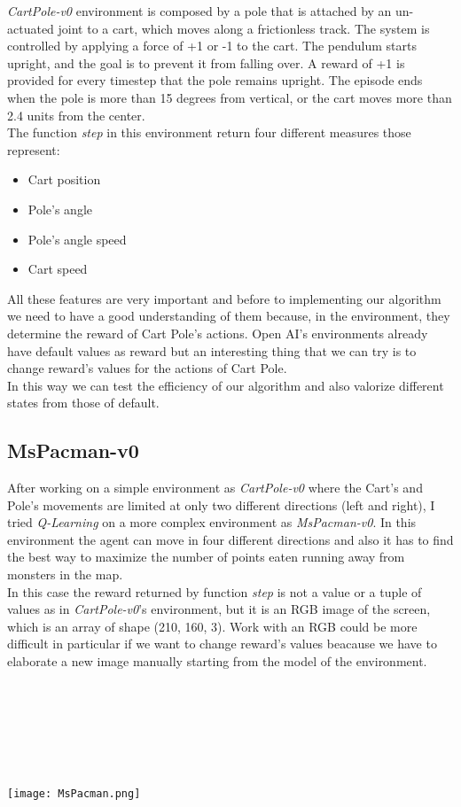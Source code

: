 \documentclass[]{report}
\begin{document}
\emph{CartPole-v0} environment is composed by a pole that is attached by an un-actuated joint to a cart, which moves along a frictionless track. The system is controlled by applying a force of +1 or -1 to the cart. The pendulum starts upright, and the goal is to prevent it from falling over. A reward of +1 is provided for every timestep that the pole remains upright. The episode ends when the pole is more than 15 degrees from vertical, or the cart moves more than 2.4 units from the center.\\
The function \emph{step} in this environment return four different measures those represent:
\begin{itemize}
	\item Cart position
	\item Pole's angle
	\item Pole's angle speed
	\item Cart speed
\end{itemize}

All these features are very important and before to implementing our algorithm we need to have a good understanding of them because, in the environment, they determine the reward of Cart Pole's actions.
Open AI's environments already have default values as reward but an interesting thing that we can try is to change reward's values for the actions of Cart Pole.\\
In this way we can test the efficiency of our algorithm and also valorize different states from those of default.

\subsection{MsPacman-v0}
After working on a simple environment as \emph{CartPole-v0} where the Cart's and Pole's movements are limited at only two different directions (left and right), I tried \emph{Q-Learning} on a more complex environment as \emph{MsPacman-v0}.
In this environment the agent can move in four different directions and also it has to find the best way to maximize the number of points eaten running away from monsters in the map.\\
In this case the reward returned by function \emph{step} is not a value or a tuple of values as in \emph{CartPole-v0}'s environment, but it is an RGB image of the screen, which is an array of shape (210, 160, 3).
Work with an RGB could be more difficult in particular if we want to change reward's values beacause we have to elaborate a new image manually starting from the model of the environment.\\
\\\\\\\\\\\\
\begin{center}
	\texttt{[image: MsPacman.png]}
\end{center}
\end{document}
